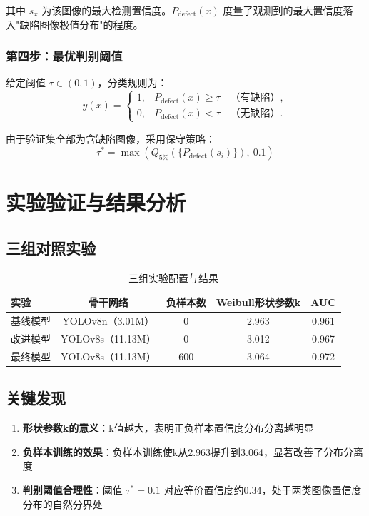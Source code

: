 \documentclass[12pt,a4paper]{ctexart}
\theoremstyle{cumcm}
\begin{document}
其中 $s_x$ 为该图像的最大检测置信度。$P_{\mathrm{defect}}(x)$ 度量了观测到的最大置信度落入"缺陷图像极值分布"的程度。

\subsubsection{第四步：最优判别阈值}

给定阈值 $\tau \in (0,1)$，分类规则为：
\begin{equation}
\hat{y}(x) = \begin{cases}
1, & P_{\mathrm{defect}}(x) \ge \tau \quad \text{（有缺陷）},\\
0, & P_{\mathrm{defect}}(x) < \tau \quad \text{（无缺陷）}.
\end{cases}
\end{equation}

由于验证集全部为含缺陷图像，采用保守策略：
\begin{equation}
\tau^{*} = \max\left(Q_{5\%}\left(\{P_{\mathrm{defect}}(s_i)\}\right),\ 0.1\right)
\end{equation}

\section{实验验证与结果分析}

\subsection{三组对照实验}

\begin{table}[H]
\centering
{}
\caption{三组实验配置与结果}
\begin{tabular}{lcccc}
\toprule
\textbf{实验} & \textbf{骨干网络} & \textbf{负样本数} & \textbf{Weibull形状参数k} & \textbf{AUC} \\
\midrule
基线模型 & YOLOv8n（3.01M） & 0 & 2.963 & 0.961 \\
改进模型 & YOLOv8s（11.13M） & 0 & 3.012 & 0.967 \\
最终模型 & YOLOv8s（11.13M） & 600 & 3.064 & 0.972 \\
\bottomrule
\end{tabular}
\end{table}

\subsection{关键发现}

\begin{enumerate}[leftmargin=2.2em,itemsep=2pt]
\item \textbf{形状参数k的意义}：k值越大，表明正负样本置信度分布分离越明显
\item \textbf{负样本训练的效果}：负样本训练使k从2.963提升到3.064，显著改善了分布分离度
\item \textbf{判别阈值合理性}：阈值 $\tau^{*} = 0.1$ 对应等价置信度约0.34，处于两类图像置信度分布的自然分界处
\end{enumerate}
\end{document}
